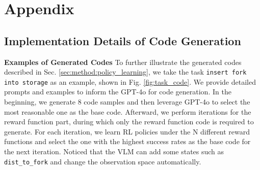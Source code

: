 \section{Appendix}

\subsection{Implementation Details of Code Generation}
\label{app:code_generation}

\textbf{Examples of Generated Codes} To further illustrate the generated codes described in Sec. \ref{sec:method:policy_learning}, we take the task \texttt{insert fork into storage} as an example, shown in Fig. \ref{fig:task_code}. We provide detailed prompts and examples to inform the GPT-4o for code generation. In the beginning, we generate 8 code samples and then leverage GPT-4o to select the most reasonable one as the base code. Afterward, we perform iterations for the reward function part, during which only the reward function code is required to generate. For each iteration, we learn RL policies under the N different reward functions and select the one with the highest success rates as the base code for the next iteration. Noticed that the VLM can add some states such as \texttt{dist\_to\_fork} and change the observation space automatically. 

